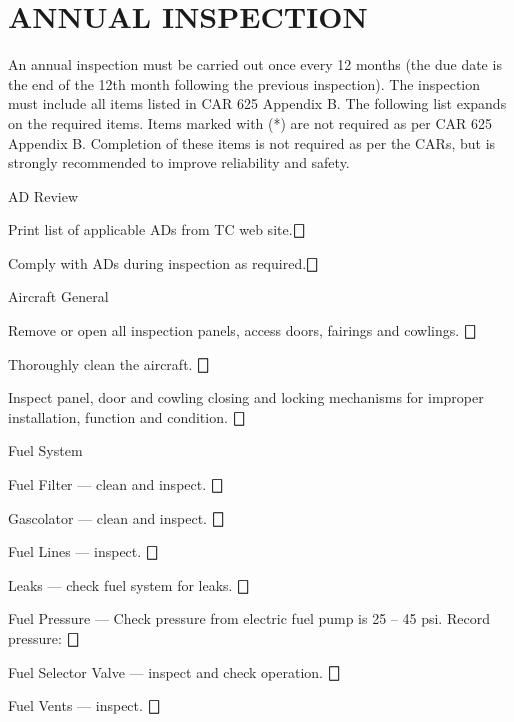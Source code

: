\section{ANNUAL INSPECTION} An annual inspection must be carried out once every 12 months (the due date is the end of the 12th month following the previous inspection). The inspection must include all items listed in CAR 625 Appendix B. The following list expands on the required items. Items marked with (*) are not required as per CAR 625 Appendix B. Completion of these items is not required as per the CARs, but is strongly recommended to improve reliability and safety.

\begin{enumerate*}
	\item{AD Review}
	\begin{enumerate*}
		\item Print list of applicable ADs from TC web site.\dotfill $\bigbox$
		\item Comply with ADs during inspection as required.\dotfill $\bigbox$
	\end{enumerate*}

  \item{Aircraft General}
  \begin{enumerate*}
    \item Remove or open all inspection panels, access doors, fairings and cowlings. \dotfill $\bigbox$
    \item Thoroughly clean the aircraft. \dotfill $\bigbox$
    \item Inspect panel, door and cowling closing and locking mechanisms for improper installation, function and condition. \dotfill $\bigbox$
		\end{enumerate*}

	\item{Fuel System} 
	\begin{enumerate*}
		\item Fuel Filter --- clean and inspect. \dotfill $\bigbox$
		\item Gascolator --- clean and inspect. \dotfill $\bigbox$
		\item Fuel Lines --- inspect. \dotfill $\bigbox$
		\item Leaks --- check fuel system for leaks. \dotfill $\bigbox$
		\item Fuel Pressure --- Check pressure from electric fuel pump is 25 -- 45 psi. Record pressure: \underline{\makebox[0.5in][l]{}} \dotfill $\bigbox$
		\item Fuel Selector Valve --- inspect and check operation. \dotfill $\bigbox$
		\item Fuel Vents --- inspect. \dotfill $\bigbox$
	\end{enumerate*}



\end{enumerate*}
